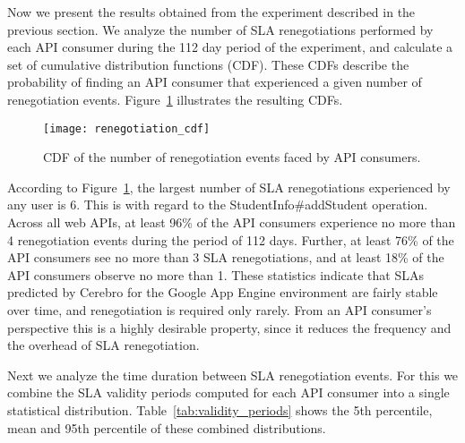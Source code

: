 Now we present the results obtained from the experiment described in the previous section. We 
analyze the number of SLA renegotiations performed by each API consumer during the 112 day
period of the experiment, and calculate a set of cumulative distribution functions (CDF). These
CDFs describe the probability of finding an API consumer that experienced a given number of
renegotiation events. Figure~\ref{fig:renegotiation_cdf} illustrates the resulting CDFs.

\begin{figure}
\centering
\texttt{[image: renegotiation\_cdf]}
\caption{CDF of the number of renegotiation events faced by API consumers.}
\label{fig:renegotiation_cdf}
\vspace{-0.2in}
\end{figure}

According to Figure~\ref{fig:renegotiation_cdf}, the largest number of SLA renegotiations experienced by 
any user is 6. This is
with regard to the StudentInfo\#addStudent operation. Across all web APIs, at least 96\% of the API
consumers experience no more than 4 renegotiation events during the period of 112 days. Further,
at least 76\% of the API consumers see no more than 3 SLA renegotiations, and at least 18\% of
the API consumers observe no more than 1. These statistics
indicate that SLAs predicted by Cerebro for the Google App Engine environment are fairly
stable over time, and renegotiation is required only rarely. From an API consumer's perspective
this is a highly desirable property, since it reduces the frequency and the overhead of SLA renegotiation.

Next we analyze the time duration between SLA renegotiation events. For this we combine the SLA validity
periods computed for each API consumer into a single statistical distribution. 
Table~\ref{tab:validity_periods} shows the 5th percentile, mean and 95th percentile of these combined distributions. 

